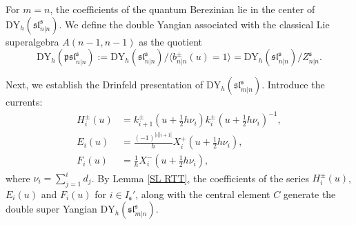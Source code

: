 \documentclass[a4paper,12pt]{article}
\numberwithin{equation}{section}
\begin{document}
For $m=n$, the coefficients of the quantum Berezinian lie in the center of $\mathrm{DY}_{h}(\mathfrak{sl}^{\mathfrak{s}}_{n|n})$. We define the double Yangian associated with the classical Lie superalgebra $A(n-1,n-1)$ as the quotient
$$
\mathrm{DY}_{h}(\mathfrak{psl}^{\mathfrak{s}}_{n|n}):=\mathrm{DY}_{h}(\mathfrak{sl}^{\mathfrak{s}}_{n|n}
)/\langle b_{n|n}^{\pm}(u)=1\rangle=\mathrm{DY}_{h}
(\mathfrak{sl}^{\mathfrak{s}}_{n|n})/Z^{\mathfrak{s}}_{n|n}.
$$

Next, we establish the Drinfeld presentation of $\mathrm{DY}_{h}(\mathfrak{sl}^{\mathfrak{s}}_{m|n})$. Introduce the currents:
\begin{align*}
H_{i}^{\pm}(u)&=k_{i+1}^{\pm}\left(u+\frac{1}{2}h\nu_{i}\right)k_{i}^{\pm}\left(u+\frac{1}{2}h\nu_{i}\right)^{-1},\\
E_{i}(u)&=\frac{(-1)^{|i||i+1|}}{h}X_{i}^{+}(u+\frac{1}{2}h\nu_{i}),\\
F_{i}(u)&=\frac{1}{h}X_{i}^{-}(u+\frac{1}{2}h\nu_{i}),
\end{align*}
where $\nu_{i}=\sum_{j=1}^{i}d_{j}$. By Lemma \ref{SL RTT}, the coefficients of the series $H_{i}^{\pm}(u)$, $E_{i}(u)$ and $F_{i}(u)$ for $i\in I_{\mathfrak{s}}'$, along with the central element $C$ generate the double super Yangian $\mathrm{DY}_{h}(\mathfrak{sl}_{m|n}^{\mathfrak{s}})$.
\end{document}
